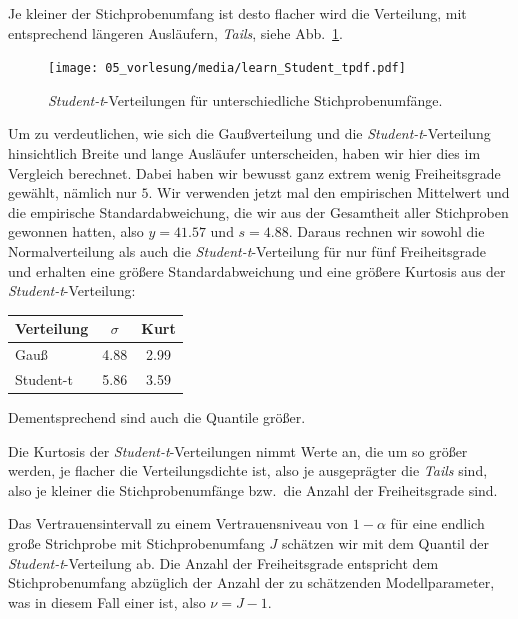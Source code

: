 Je kleiner der Stichprobenumfang ist desto flacher wird die Verteilung, mit entsprechend
längeren Ausläufern, \textsl{Tails}, siehe
Abb.~\ref{studentt}.
\begin{figure}
\begin{center}
\texttt{[image: 05\_vorlesung/media/learn\_Student\_tpdf.pdf]}
\caption{\label{studentt} \textsl{Student-t}-Verteilungen für unterschiedliche Stichprobenumfänge.}
\end{center}
\end{figure}
Um zu verdeutlichen, wie sich die Gaußverteilung und die \textsl{Student-t}-Verteilung hinsichtlich
Breite und lange Ausläufer unterscheiden, haben wir hier dies im Vergleich berechnet.
Dabei haben wir bewusst ganz extrem wenig Freiheitsgrade gewählt, nämlich nur $5$.
Wir verwenden jetzt mal den empirischen Mittelwert und die empirische Standardabweichung,
die wir aus der Gesamtheit aller Stichproben gewonnen hatten, also $y = 41.57$
und $s = 4.88$. Daraus rechnen wir sowohl die Normalverteilung als auch die
\textsl{Student-t}-Verteilung für nur fünf Freiheitsgrade und erhalten eine größere Standardabweichung
und eine größere Kurtosis aus der \textsl{Student-t}-Verteilung:
\begin{center}
\begin{tabular}{l||c|c}
\hline
Verteilung & $\sigma$ & Kurt\\
\hline
Gauß &   4.88 &  2.99 \\
Student-t &  5.86 &  3.59 \\
\hline
\end{tabular}
\end{center}
Dementsprechend sind auch die Quantile größer.


Die Kurtosis der \textsl{Student-t}-Verteilungen nimmt Werte an, die um so größer werden, je flacher die Verteilungsdichte
ist, also je ausgeprägter die \textsl{Tails} sind, also je kleiner die Stichprobenumfänge bzw.\ die
Anzahl der Freiheitsgrade sind.


Das Vertrauensintervall zu einem Vertrauensniveau von $1 - \alpha$ für eine endlich große
Strichprobe mit Stichprobenumfang $J$ schätzen wir mit dem Quantil der \textsl{Student-t}-Verteilung ab.
Die Anzahl der Freiheitsgrade entspricht dem Stichprobenumfang abzüglich der Anzahl der zu
schätzenden Modellparameter, was in diesem Fall einer ist, also $\nu = J - 1$.




